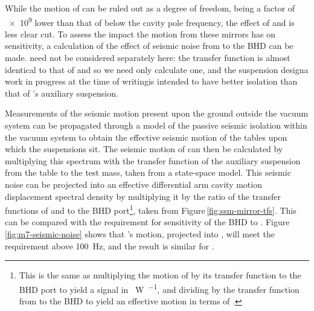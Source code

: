 While the motion of \MNINE{} can be ruled out as a degree of freedom, being a factor of \SI{e9}{} lower than that of \LMINUS{} below the cavity pole frequency, the effect of \MSIX{} and \MSEVEN{} is less clear cut. To assess the impact the motion from these mirrors has on \LMINUS{} sensitivity, a calculation of the effect of seismic noise from \MSEVEN{} to the \gls{BHD} can be made. \MSIX{} need not be considered separately here: the transfer function is almost identical to that of \MSEVEN{} and so we need only calculate one, and the suspension design\textemdash a work in progress at the time of writing\textemdash is intended to have better isolation than that of \MSEVEN{}'s auxiliary suspension.

Measurements of the seismic motion present upon the ground outside the vacuum system can be propagated through a model of the passive seismic isolation within the vacuum system to obtain the effective seismic motion of the tables upon which the suspensions sit. The seismic motion of \MSEVEN{} can then be calculated by multiplying this spectrum with the transfer function of the auxiliary suspension from the table to the test mass, taken from a state-space model. This seismic noise can be projected into an effective differential arm cavity motion displacement spectral density by multiplying it by the ratio of the transfer functions of \MSEVEN{} and \LMINUS{} to the \gls{BHD} port\footnote{This is the same as multiplying the motion of \MSEVEN{} by its transfer function to the \gls{BHD} port to yield a signal in \SI{}{\watt\per\sqrthz}, and dividing by the transfer function from \LMINUS{} to the \gls{BHD} to yield an effective motion in terms of \LMINUS{}.}, taken from Figure\,\ref{fig:ssm-mirror-tfs}. This can be compared with the requirement for sensitivity of the \gls{BHD} to \LMINUS{}. Figure\,\ref{fig:m7-seismic-noise} shows that \MSEVEN{}'s motion, projected into \LMINUS{}, will meet the requirement above \SI{100}{\hertz}, and the result is similar for \MSIX{}.

